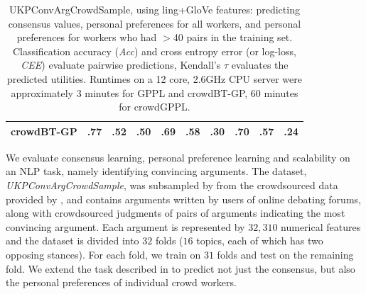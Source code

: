 \begin{table}
\begin{tabular}{ l l l l@{\hskip 1.0cm} l l l@{\hskip 1.0cm} l l l}
 crowdBT-GP & .77 & .52 & .50 & .69 & \textbf{.58} & .30 & .70 & \textbf{.57} & .24
 \\ \bottomrule
\end{tabular}
\caption{UKPConvArgCrowdSample,  using ling+GloVe features: predicting consensus values, personal preferences for all workers,
and personal preferences for workers who had $>$40 pairs in the training set.
Classification accuracy (\emph{Acc}) and cross entropy error (or log-loss, \emph{CEE}) evaluate
pairwise predictions, 
Kendall's $\tau$ evaluates the predicted utilities. 
Runtimes on a 12 core, 2.6GHz CPU server were approximately 3 minutes for GPPL and crowdBT-GP, 
 60 minutes for crowdGPPL.
}
\label{tab:convarg}
\end{table}
We evaluate consensus learning, personal preference learning and scalability
on an NLP task, namely identifying convincing arguments. 
The dataset, \emph{UKPConvArgCrowdSample}, was subsampled by \citet{simpson2018finding}
from the crowdsourced data provided by \citet{habernal2016argument}, and
contains arguments written by users
of online debating forums,
along with crowdsourced judgments of pairs of arguments
 indicating the most convincing argument.
Each argument is represented by $32,310$ numerical features and the
dataset is divided into $32$ folds ($16$ topics, each of which has two opposing stances). For each fold, we train on $31$ folds and test on the remaining fold.
We extend
the task described in \citet{simpson2018finding} to predict not just the consensus,
but also the personal preferences of individual crowd workers.
